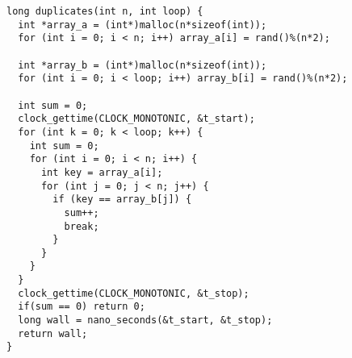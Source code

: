 \documentclass[a4paper,11pt]{article}
\begin{document}
\begin{verbatim}
long duplicates(int n, int loop) {
  int *array_a = (int*)malloc(n*sizeof(int));
  for (int i = 0; i < n; i++) array_a[i] = rand()%(n*2);

  int *array_b = (int*)malloc(n*sizeof(int));
  for (int i = 0; i < loop; i++) array_b[i] = rand()%(n*2);

  int sum = 0;
  clock_gettime(CLOCK_MONOTONIC, &t_start);
  for (int k = 0; k < loop; k++) {
    int sum = 0;
    for (int i = 0; i < n; i++) {
      int key = array_a[i];
      for (int j = 0; j < n; j++) {
        if (key == array_b[j]) {
          sum++;
          break;
        }
      }
    }
  }
  clock_gettime(CLOCK_MONOTONIC, &t_stop);
  if(sum == 0) return 0;
  long wall = nano_seconds(&t_start, &t_stop);
  return wall;
}
\end{verbatim}
\end{document}
